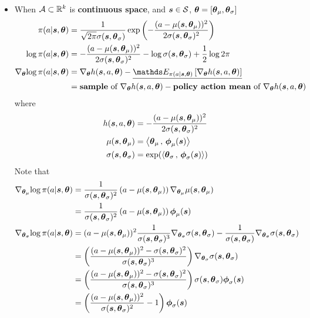 \documentclass[11pt]{article}
\begin{document}
\begin{itemize}
\item  When ${\mathcal A} \subset {\mathbb R}^{k}$ is \textbf{continuous space},  and $\boldsymbol{s} \in {\mathcal S}$, $\boldsymbol{\theta} = [\boldsymbol{\theta}_{\mu}, \boldsymbol{\theta}_{\sigma}]$
\begin{align}
\pi(a |\mb{s}, \mb{\theta}) &= \frac{1}{\sqrt{2\pi}\sigma(\mb{s}, \mb{\theta}_{\sigma})}\exp\paren{-\frac{(a - \mu(\mb{s}, \mb{\theta}_{\mu}))^2}{2\sigma(\mb{s}, \mb{\theta}_{\sigma})^2}}
 \label{eqn: normal_policy} \\
\log \pi(a |\mb{s}, \mb{\theta}) &= -\frac{(a - \mu(\mb{s}, \mb{\theta}_{\mu}) )^2}{2\sigma(\mb{s}, \mb{\theta}_{\sigma})^2} - \log\sigma(\mb{s}, \mb{\theta}_{\sigma})+ \frac{1}{2}\log{2\pi} \label{eqn: log_normal_policy} \\
\grad{\mb{\theta}}{\log \pi(a |\mb{s}, \mb{\theta}) } &= \grad{\mb{\theta}}{h(\mb{s}, a, \mb{\theta})} - \underline{\E{\pi(a |\mb{s}, \mb{\theta}) }{ \grad{\mb{\theta}}{h(\mb{s}, a, \mb{\theta})}}}   \label{eqn: grad_log_normal_policy} \\
&= \text{\textbf{sample} of }\grad{\mb{\theta}}{h(\mb{s}, a, \mb{\theta})} -  \text{\textbf{policy action mean} of }\grad{\mb{\theta}}{h(\mb{s}, a, \mb{\theta})} \nonumber
\end{align} where 
\begin{align*}
h(\boldsymbol{s}, a,\boldsymbol{\theta}) &= -\frac{(a - \mu(\boldsymbol{s}, \boldsymbol{\theta}_{\mu}))^2}{2\sigma(\boldsymbol{s}, \boldsymbol{\theta}_{\sigma})^2}\\
\mu(\boldsymbol{s}, \boldsymbol{\theta}_{\mu}) &= \left\langle \boldsymbol{\theta}_{\mu}\,,\, \boldsymbol{\phi}_{\mu}(\boldsymbol{s}) \right\rangle \\
\sigma(\boldsymbol{s}, \boldsymbol{\theta}_{\sigma}) &= \exp(\left\langle \boldsymbol{\theta}_{\sigma}\,,\, \boldsymbol{\phi}_{\sigma}(\boldsymbol{s}) \right\rangle)
\end{align*}
Note that
\begin{align*}
\nabla_{\boldsymbol{\theta}_{\mu}}{\log \pi(a |\boldsymbol{s}, \boldsymbol{\theta}) } &= \frac{1}{\sigma(\boldsymbol{s}, \boldsymbol{\theta}_{\sigma})^2}\left(a - \mu(\boldsymbol{s}, \boldsymbol{\theta}_{\mu})\right)\nabla_{\boldsymbol{\theta}_{\mu}}{\mu(\boldsymbol{s}, \boldsymbol{\theta}_{\mu}) } \\
&= \frac{1}{\sigma(\boldsymbol{s}, \boldsymbol{\theta}_{\sigma})^2}\left(a - \mu(\boldsymbol{s}, \boldsymbol{\theta}_{\mu})\right)\boldsymbol{\phi}_{\mu}(\boldsymbol{s}) \\
\nabla_{\boldsymbol{\theta}_{\sigma}}{\log \pi(a |\boldsymbol{s}, \boldsymbol{\theta}) } &=(a - \mu(\boldsymbol{s}, \boldsymbol{\theta}_{\mu}))^2 \frac{1}{\sigma(\boldsymbol{s}, \boldsymbol{\theta}_{\sigma})^3}\nabla_{\boldsymbol{\theta}_{\sigma}}{\sigma(\boldsymbol{s}, \boldsymbol{\theta}_{\sigma}) } - \frac{1}{\sigma(\boldsymbol{s}, \boldsymbol{\theta}_{\sigma})}\nabla_{\boldsymbol{\theta}_{\sigma}}{\sigma(\boldsymbol{s}, \boldsymbol{\theta}_{\sigma}) } \\
&= \left(\frac{(a - \mu(\boldsymbol{s}, \boldsymbol{\theta}_{\mu}))^2-\sigma(\boldsymbol{s}, \boldsymbol{\theta}_{\sigma})^2}{\sigma(\boldsymbol{s}, \boldsymbol{\theta}_{\sigma})^3}\right)\nabla_{\boldsymbol{\theta}_{\sigma}}{\sigma(\boldsymbol{s}, \boldsymbol{\theta}_{\sigma}) } \\
&= \left(\frac{(a - \mu(\boldsymbol{s}, \boldsymbol{\theta}_{\mu}))^2-\sigma(\boldsymbol{s}, \boldsymbol{\theta}_{\sigma})^2}{\sigma(\boldsymbol{s}, \boldsymbol{\theta}_{\sigma})^3}\right)\sigma(\boldsymbol{s}, \boldsymbol{\theta}_{\sigma})\boldsymbol{\phi}_{\sigma}(\boldsymbol{s}) \\
&= \left(\frac{(a - \mu(\boldsymbol{s}, \boldsymbol{\theta}_{\mu}))^2}{\sigma(\boldsymbol{s}, \boldsymbol{\theta}_{\sigma})^2} - 1\right)\boldsymbol{\phi}_{\sigma}(\boldsymbol{s})
\end{align*}
\end{itemize}
\end{document}
